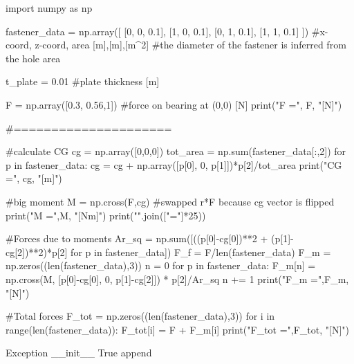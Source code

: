 \documentclass[a4paper, twoside, 12pt]{report}
\begin{document}
\begin{python}
import numpy as np

fastener_data = np.array([
	[0, 0, 0.1],
	[1, 0, 0.1],
	[0, 1, 0.1],
	[1, 1, 0.1]
	])	#x-coord, z-coord, area  [m],[m],[m^2]
		#the diameter of the fastener is inferred from the hole area

t_plate = 0.01 #plate thickness [m]

F = np.array([0.3, 0.56,1]) #force on bearing at (0,0) [N]
print("F =", F, "[N]")

#=====================

#calculate CG
cg = np.array([0,0,0])
tot_area = np.sum(fastener_data[:,2])
for p in fastener_data:
	cg = cg + np.array([p[0], 0, p[1]])*p[2]/tot_area
print("CG =", cg, "[m]")

#big moment
M = np.cross(F,cg) #swapped r*F because cg vector is flipped
print("M =",M, "[Nm]")
print("".join(["="]*25))

#Forces due to moments
Ar_sq = np.sum([((p[0]-cg[0])**2 + (p[1]-cg[2])**2)*p[2] for p in fastener_data])
F_f = F/len(fastener_data)
F_m = np.zeros((len(fastener_data),3))
n = 0
for p in fastener_data:
	F_m[n] = np.cross(M, [p[0]-cg[0], 0, p[1]-cg[2]]) * p[2]/Ar_sq
	n += 1
print("F_m =\n",F_m, "[N]")

#Total forces
F_tot = np.zeros((len(fastener_data),3))
for i in range(len(fastener_data)):
	F_tot[i] = F + F_m[i]
print("F_tot =\n",F_tot, "[N]")

Exception
__init__
True append
\end{python}



\end{document}
